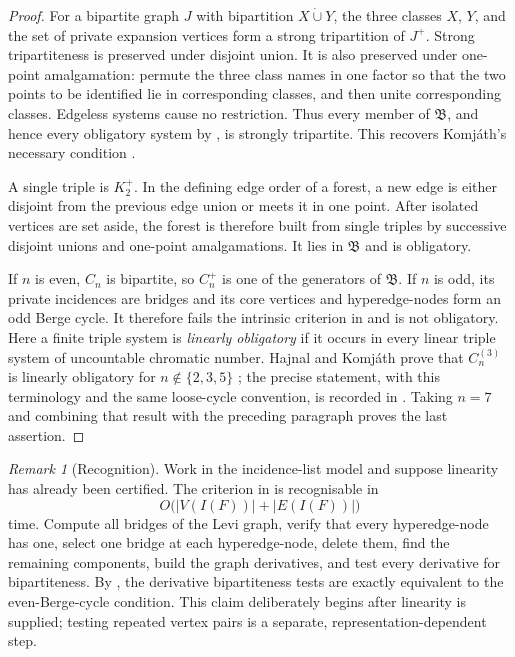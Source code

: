 \documentclass[11pt]{amsart}
\theoremstyle{definition}
\theoremstyle{remark}
\newtheorem{remark}[remark]{Remark}
\numberwithin{equation}{section}
\newcommand{\Bclass}{\mathfrak B}
\begin{document}
\begin{proof}
For a bipartite graph $J$ with bipartition $X\mathbin{\dot\cup}Y$, the
three classes $X$, $Y$, and the set of private expansion vertices form a
strong tripartition of $J^+$.  Strong tripartiteness is preserved under
disjoint union.  It is also preserved under one-point amalgamation:
permute the three class names in one factor so that the two points to be
identified lie in corresponding classes, and then unite corresponding
classes.  Edgeless systems cause no restriction.  Thus every member of
$\Bclass$, and hence every obligatory system by
, is strongly tripartite.  This recovers
Komj\'ath's necessary condition \cite[pp.~233--238]{Komjath2001}.

A single triple is $K_2^+$.  In the defining edge order of a forest, a
new edge is either disjoint from the previous edge union or meets it in
one point.  After isolated vertices are set aside, the forest is
therefore built from single triples by successive disjoint unions and
one-point amalgamations.  It lies in $\Bclass$ and is obligatory.

If $n$ is even, $C_n$ is bipartite, so $C_n^+$ is one of the generators
of $\Bclass$.  If $n$ is odd, its private incidences are bridges and its
core vertices and hyperedge-nodes form an odd Berge cycle.  It therefore
fails the intrinsic criterion in  and is not
obligatory.  Here a finite triple system is \emph{linearly obligatory} if it occurs
in every linear triple system of uncountable chromatic number.  Hajnal and
Komj\'ath prove that $C_n^{(3)}$ is linearly obligatory for
$n\notin\{2,3,5\}$ \cite{HK2008}; the precise statement, with this
terminology and the same loose-cycle convention, is recorded in
\cite[\S3.7, p.~43]{ReiherGirth}.  Taking $n=7$ and combining that result
with the preceding paragraph proves the last assertion.
\end{proof}

\begin{remark}[Recognition]
\label{rem:recognition}
Work in the incidence-list model and suppose linearity has already been
certified.  The criterion in  is recognisable in
\[
 O\bigl(|V(I(F))|+|E(I(F))|\bigr)
\]
time.  Compute all bridges of the Levi graph, verify that every
hyperedge-node has one, select one bridge at each hyperedge-node, delete
them, find the remaining components, build the graph derivatives, and
test every derivative for bipartiteness.  By
, the derivative bipartiteness tests are exactly
equivalent to the even-Berge-cycle condition.  This claim deliberately
begins after linearity is supplied; testing repeated vertex pairs is a
separate, representation-dependent step.
\end{remark}
\end{document}
